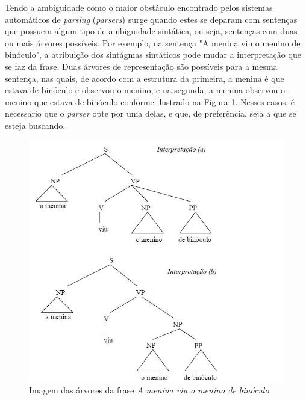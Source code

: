 Tendo a ambiguidade como o maior obstáculo encontrado pelos sistemas automáticos de \emph{parsing} (\emph{parsers}) surge quando estes se deparam com sentenças que possuem algum tipo de ambiguidade sintática, ou seja, sentenças com duas ou mais árvores possíveis. Por exemplo, na sentença "A menina viu o menino de binóculo", a atribuição dos sintágmas sintáticos pode mudar a interpretação que se faz da frase. Duas árvores de representação são possíveis para a mesma sentença, nas quais, de acordo com a estrutura da primeira, a menina é que estava de binóculo e observou o menino, e na segunda, a menina observou o menino que estava de binóculo conforme ilustrado na Figura \ref{ambiguidade}. Nesses casos, é necessário que o \emph{parser} opte por uma delas, e que, de preferência, seja a que se esteja buscando.




\begin{figure}
	\begin{center}
		\includegraphics[scale=0.5]{ambig.jpg}
		\caption{\label{ambiguidade} Imagem das árvores da frase \emph{A menina viu o menino de binóculo}}		
	\end{center}
\end{figure}


